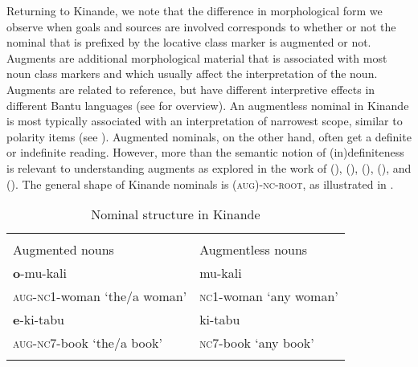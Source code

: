 \documentclass[output=paper]{langscibook}
\begin{document}
\z

Returning to Kinande, we note that the difference in morphological form we observe when goals and sources are involved corresponds to whether or not the nominal that is prefixed by the locative class marker is augmented or not. Augments are additional morphological material that is associated with most noun class markers and which usually affect the interpretation of the noun. Augments are related to reference, but have different interpretive effects in different Bantu languages (see \citeauthor{vandeVelde2019} \citeyear{vandeVelde2019} for overview). An augmentless nominal in Kinande is most typically associated with an interpretation of narrowest scope, similar to polarity items (see \citeauthor{Progovac1993} \citeyear{Progovac1993}). Augmented nominals, on the other hand, often get a definite or indefinite reading. However, more than the semantic notion of (in)definiteness is relevant to understanding augments as explored in the work of \citeauthor{Gambarage2019} (\citeyear{Gambarage2019}), \citeauthor{Halpert2015} (\citeyear{Halpert2015}), \citeauthor{HymanKatamba1993} (\citeyear{HymanKatamba1993}), \citeauthor{Progovac1993} (\citeyear{Progovac1993}),  and \citeauthor{vandeVelde2019} (\citeyear{vandeVelde2019}). The general shape of Kinande nominals is \textsc{(aug)-nc-root}, as illustrated in .

\begin{table}
\caption{Nominal structure in Kinande}
\label{tab:schneider:NominalstructureKinande}
 \begin{tabular}{ll}
  \lsptoprule
           \multicolumn{2}{c}{(Augment-)noun class marker-noun}\\
  Augmented nouns  &   Augmentless nouns \\
  \midrule
  \textbf{o}-mu-kali  &   mu-kali \\
  \textsc{aug-nc1-}woman ‘the/a woman’ & \textsc{nc1-}woman `any woman' \\\tablevspace
  
  \textbf{e}-ki-tabu & ki-tabu\\
  \textsc{aug-nc7-}book ‘the/a book’ & \textsc{nc7-}book `any book'\\
  \lspbottomrule
 \end{tabular}
\end{table}
\end{document}
